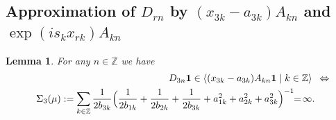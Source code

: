 \documentclass[preprint,12pt]{elsarticle}
\newtheorem{lem}[thm]{Lemma}
\numberwithin{equation}{section}
\begin{document}
\subsection{Approximation of $D_{rn}$ by  $(x_{3k}-a_{3k})A_{kn}$ and $\exp(i s_kx_{rk})A_{kn}$}
\begin{lem}
\label{l.x(3)A}
For any  $n\in {\mathbb Z}$ we have
\begin{eqnarray}
\nonumber
&&D_{3n}{\bf 1}\in\langle (x_{3k}-a_{3k})A_{kn}{\bf 1}\mid k\in {\mathbb Z}\rangle
\,\,\,\Leftrightarrow\,\,\,\\
\label{x(3)A}
&&
\Sigma_3(\mu):=
\sum_{k\in \mathbb Z}\frac{1}{2b_{3k}}\Big(\frac{1}{2b_{1k}}+\frac{1}{2b_{2k}}+\frac{1}{2b_{3k}}+a_{1k}^2+a_{2k}^2+a_{3k}^2\Big)^{-1}\!\!=\!\infty.\qquad
\end{eqnarray}
\end{lem}
\end{document}
